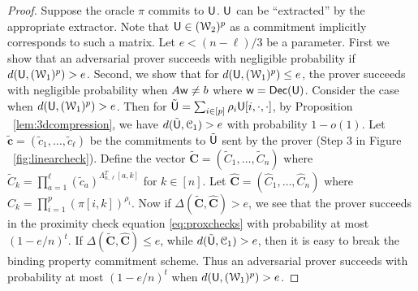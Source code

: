\begin{proof}
	Suppose the oracle $\pi$ commits to $\mathsf{U}$. $\mathsf{U}$ can be ``extracted'' by the appropriate extractor. Note that $\mathsf{U}\in (\mathcal{W}_2)^p$ as a commitment implicitly corresponds to such a matrix. Let $e<(n-\ell)/3$ be a parameter. First we show that an adversarial prover succeeds with negligible probability if $d(\mathsf{U},(\mathcal{W}_1)^p)>e$. Second, we 	show that for $d(\mathsf{U},(\mathcal{W}_1)^p)\leq e$, the prover succeeds with negligible probability when $A\mathsf{w}\neq b$ where $\mathsf{w}=\mathsf{Dec}(\mathsf{U})$. Consider the case when $d(\mathsf{U},(\mathcal{W}_1)^p)>e$. Then for $\tilde{\mathsf{U}}=\sum_{i\in [p]}\rho_i\mathsf{U}[i,\cdot,\cdot]$, by Proposition ~\ref{lem:3dcompression},	we have $d(\tilde{\mathsf{U}},\mathcal{C}_1)>e$ with probability $1-o(1)$. Let $\tilde{\bm{c}}=(\tilde{c}_1, \ldots,\tilde{c}_\ell)$ be the commitments to $\tilde{\mathsf{U}}$ sent by the prover (Step 3 in Figure ~\ref{fig:linearcheck}). 
	Define the vector $\tilde{\bm{C}}=(\tilde{C}_1,\ldots,\tilde{C}_n)$ where $\tilde{C}_k=\prod_{a=1}^\ell (\tilde{c}_a)^{\Lambda_{n,\ell}^T[a,k]}$ for $k\in [n]$. Let $\hat{\bm{C}}=(\hat{C}_1,\ldots,\hat{C}_n)$ where $\hat{C}_k=\prod_{i=1}^p(\pi[i,k])^{\rho_i}$. Now if $\Delta(\tilde{\bm{C}},\hat{\bm{C}})>e$, we see that the prover succeeds in the proximity check equation \eqref{eq:proxchecks} with probability at most $(1-e/n)^t$. 
	If $\Delta(\tilde{\bm{C}}, \hat{\bm{C}}) \leq e$, while $d(\tilde{\mathsf{U}},\mathcal{C}_1)>e$, then it is easy to break the binding property commitment scheme. Thus an adversarial prover succeeds with probability at most $(1-e/n)^t$ when $d(\mathsf{U},(\mathcal{W}_1)^p)>e$.
	

\end{proof}
